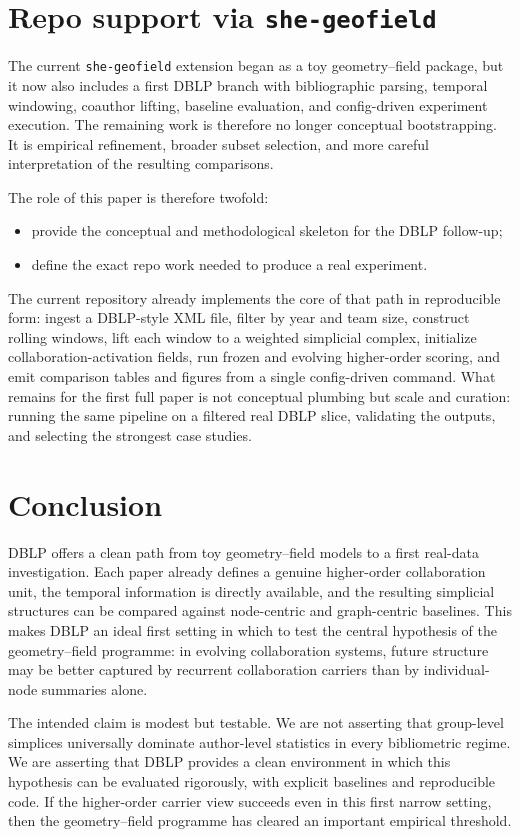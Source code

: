 \documentclass[11pt]{article}
\begin{document}
\section{Repo support via \texttt{she-geofield}}
The current \texttt{she-geofield} extension began as a toy geometry--field package, but it now also includes a first DBLP branch with bibliographic parsing, temporal windowing, coauthor lifting, baseline evaluation, and config-driven experiment execution. The remaining work is therefore no longer conceptual bootstrapping. It is empirical refinement, broader subset selection, and more careful interpretation of the resulting comparisons.

The role of this paper is therefore twofold:
\begin{itemize}
    \item provide the conceptual and methodological skeleton for the DBLP follow-up;
    \item define the exact repo work needed to produce a real experiment.
\end{itemize}

The current repository already implements the core of that path in reproducible form: ingest a DBLP-style XML file, filter by year and team size, construct rolling windows, lift each window to a weighted simplicial complex, initialize collaboration-activation fields, run frozen and evolving higher-order scoring, and emit comparison tables and figures from a single config-driven command. What remains for the first full paper is not conceptual plumbing but scale and curation: running the same pipeline on a filtered real DBLP slice, validating the outputs, and selecting the strongest case studies.

\section{Conclusion}
DBLP offers a clean path from toy geometry--field models to a first real-data investigation. Each paper already defines a genuine higher-order collaboration unit, the temporal information is directly available, and the resulting simplicial structures can be compared against node-centric and graph-centric baselines. This makes DBLP an ideal first setting in which to test the central hypothesis of the geometry--field programme: in evolving collaboration systems, future structure may be better captured by recurrent collaboration carriers than by individual-node summaries alone.

The intended claim is modest but testable. We are not asserting that group-level simplices universally dominate author-level statistics in every bibliometric regime. We are asserting that DBLP provides a clean environment in which this hypothesis can be evaluated rigorously, with explicit baselines and reproducible code. If the higher-order carrier view succeeds even in this first narrow setting, then the geometry--field programme has cleared an important empirical threshold.
\end{document}
